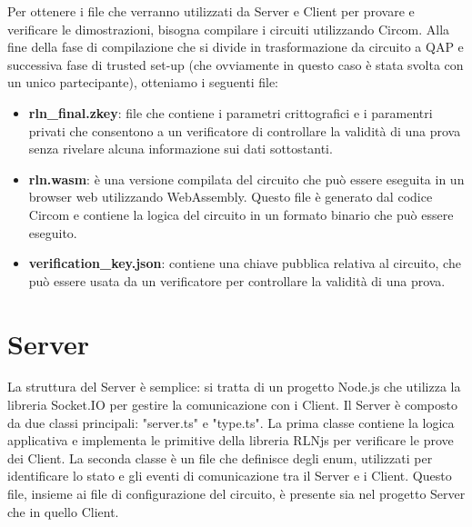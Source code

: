Per ottenere i file che verranno utilizzati da Server e Client per provare e verificare le dimostrazioni, bisogna
compilare i circuiti utilizzando Circom. Alla fine della fase di compilazione che si divide in trasformazione da
circuito a QAP e successiva fase di trusted set-up (che ovviamente in questo caso è stata svolta con un unico
partecipante), otteniamo i seguenti file:
\begin{itemize}
    \item \textbf{rln\_final.zkey}: file che contiene i parametri crittografici e i paramentri privati che consentono a
    un verificatore di controllare la validità di una prova senza rivelare alcuna informazione sui dati sottostanti.
    \item \textbf{rln.wasm}: è una versione compilata del circuito che può essere eseguita in un browser web utilizzando
    WebAssembly. Questo file è generato dal codice Circom e contiene la logica del circuito in un formato binario che
    può essere eseguito.
    \item \textbf{verification\_key.json}: contiene una chiave pubblica relativa al circuito, che può essere usata da un
    verificatore per controllare la validità di una prova. \end{itemize}

\section{Server}
La struttura del Server è semplice: si tratta di un progetto Node.js che utilizza la libreria Socket.IO per gestire la
comunicazione con i Client. Il Server è composto da due classi principali: "server.ts" e "type.ts". La prima classe
contiene la logica applicativa e implementa le primitive della libreria RLNjs per verificare le prove dei Client. La
seconda classe è un file che definisce degli enum, utilizzati per identificare lo stato e gli eventi di comunicazione
tra il Server e i Client. Questo file, insieme ai file di configurazione del circuito, è presente sia nel progetto
Server che in quello Client.

